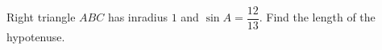 Right triangle $ABC$ has inradius $1$ and $\sin A=\dfrac{12}{13}$. Find the length of the hypotenuse.
